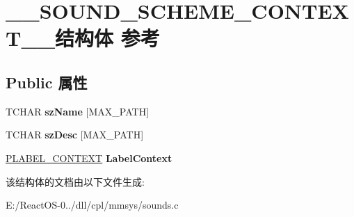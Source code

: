 \hypertarget{struct_____s_o_u_n_d___s_c_h_e_m_e___c_o_n_t_e_x_t____}{}\section{\+\_\+\+\_\+\+S\+O\+U\+N\+D\+\_\+\+S\+C\+H\+E\+M\+E\+\_\+\+C\+O\+N\+T\+E\+X\+T\+\_\+\+\_\+结构体 参考}
\label{struct_____s_o_u_n_d___s_c_h_e_m_e___c_o_n_t_e_x_t____}
\subsection*{Public 属性}
\begin{DoxyCompactItemize}
\item 
\mbox{\label{struct_____s_o_u_n_d___s_c_h_e_m_e___c_o_n_t_e_x_t_____a2add7b0bda05efba8d1f1059ed250a1d}} 
T\+C\+H\+AR {\bfseries sz\+Name} \mbox{[}M\+A\+X\+\_\+\+P\+A\+TH\mbox{]}
\item 
\mbox{\label{struct_____s_o_u_n_d___s_c_h_e_m_e___c_o_n_t_e_x_t_____a7209866b5442e6aa0560d0626162789c}} 
T\+C\+H\+AR {\bfseries sz\+Desc} \mbox{[}M\+A\+X\+\_\+\+P\+A\+TH\mbox{]}
\item 
\mbox{\label{struct_____s_o_u_n_d___s_c_h_e_m_e___c_o_n_t_e_x_t_____ae07053b0a76837e11c1681179415d7a2}} 
\hyperlink{struct_____l_a_b_e_l___c_o_n_t_e_x_t____}{P\+L\+A\+B\+E\+L\+\_\+\+C\+O\+N\+T\+E\+XT} {\bfseries Label\+Context}
\end{DoxyCompactItemize}


该结构体的文档由以下文件生成\+:\begin{DoxyCompactItemize}
\item 
E\+:/\+React\+O\+S-\/0../dll/cpl/mmsys/sounds.\+c\end{DoxyCompactItemize}
